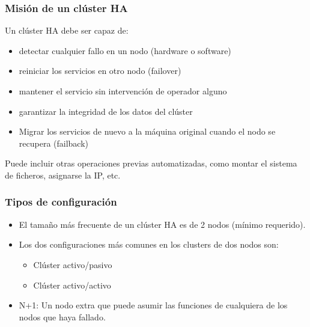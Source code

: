 \documentclass{beamer}
\begin{document}

\begin{frame}
\frametitle{Misión de un clúster HA}

Un clúster HA debe ser capaz de: 

\begin{itemize}
\item detectar cualquier fallo en un nodo (hardware o software)
\item reiniciar los servicios en otro nodo (\alert{failover})
\item mantener el servicio sin intervención de operador alguno
\item garantizar la integridad de los datos del clúster
\item Migrar los servicios de nuevo a la máquina original cuando el nodo se recupera (\alert{failback})
\end{itemize}

\bigskip

\small
Puede incluir otras operaciones previas automatizadas, como montar el sistema de ficheros, asignarse la IP, etc. 

\end{frame}


\begin{frame}
\frametitle{Tipos de configuración}

\begin{itemize}
\item El tamaño más frecuente de un clúster HA es de \alert{2 nodos} (mínimo requerido).
\item Los dos configuraciones más comunes en los clusters de dos nodos son:
	\begin{itemize}
	\item \alert{Clúster activo/pasivo}
	\item \alert{Clúster activo/activo}
	\end{itemize}
\item \alert{N+1}: Un nodo extra que puede asumir las funciones de cualquiera de los nodos que haya fallado.
\end{itemize}

\end{frame}


\end{document}
